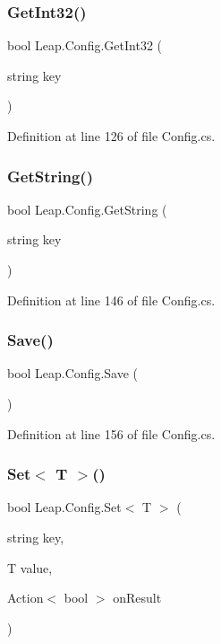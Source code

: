 \subsubsection{\texorpdfstring{GetInt32()}{GetInt32()}}
{\footnotesize\ttfamily bool Leap.\+Config.\+Get\+Int32 (\begin{DoxyParamCaption}\item[{string}]{key }\end{DoxyParamCaption})}



Definition at line 126 of file Config.\+cs.

\mbox{\label{class_leap_1_1_config_a50bd7b7209f1d9428910e88278c6b750}} 
\subsubsection{\texorpdfstring{GetString()}{GetString()}}
{\footnotesize\ttfamily bool Leap.\+Config.\+Get\+String (\begin{DoxyParamCaption}\item[{string}]{key }\end{DoxyParamCaption})}



Definition at line 146 of file Config.\+cs.

\mbox{\label{class_leap_1_1_config_a631db08c670e9df74b6873669d9636eb}} 
\subsubsection{\texorpdfstring{Save()}{Save()}}
{\footnotesize\ttfamily bool Leap.\+Config.\+Save (\begin{DoxyParamCaption}{ }\end{DoxyParamCaption})}



Definition at line 156 of file Config.\+cs.

\mbox{\label{class_leap_1_1_config_acd77254986861d4e7592b5a619a82388}} 
\subsubsection{\texorpdfstring{Set$<$ T $>$()}{Set< T >()}}
{\footnotesize\ttfamily bool Leap.\+Config.\+Set$<$ T $>$ (\begin{DoxyParamCaption}\item[{string}]{key,  }\item[{T}]{value,  }\item[{Action$<$ bool $>$}]{on\+Result }\end{DoxyParamCaption})}



